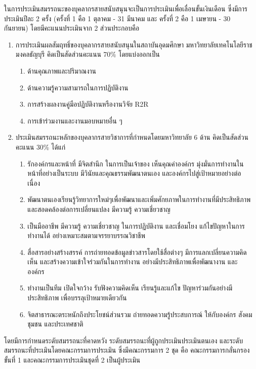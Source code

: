 ในการประเมินสมรรถนะของบุคลากรสายสนับสนุนจะเป็นการประเมินเพื่อเลื่อนขั้นเงินเดือน  ซึ่งมีการประเมินปีละ 2 ครั้ง (ครั้งที่ 1 คือ 1 ตุลาคม - 31 มีนาคม และ ครั้งที่ 2 คือ 1 เมษายน - 30 กันยายน)  โดยมีคะแนนประเมินจาก 2 ส่วนประกอบคือ 
\begin{enumerate}
\item การประเมินผลสัมฤทธิ์ของบุคลากรสายสนับสนุนในสถาบันอุดมศึกษา มหาวิทยาลัยเทคโนโลยีราชมงคลธัญบุรี คิดเป็นสัดส่วนคะแนน 70\% โดยแบ่งออกเป็น
\begin{enumerate}[label=(\arabic*),leftmargin=0.8cm, labelsep=2mm]
\item ด้านคุณภาพและปริมาณงาน
\item ด้านความรู้ความสามารถในการปฏิบัติงาน
\item การสร้างผลงานคู่มือปฏิบัติงานหรืองานวิจัย R2R
\item การเข้าร่วมงานและงานมอบหมายอื่น ๆ
\end{enumerate}
\item ประเมินสมรรถนะหลักของบุคลากรสายวิชาการที่กำหนดโดยมหาวิทยาลัย 6 ด้าน คิดเป็นสัดส่วนคะแนน 30\% ได้แก่
\begin{enumerate}[label=(\arabic*),leftmargin=0.8cm, labelsep=2mm]
\item รักองค์กรและหน้าที่ มีจิตสำนึก ในการเป็นเจ้าของ เห็นคุณค่าองค์กร มุ่งมั่นการทำงานในหน้าที่อย่างเป็นระบบ มีวินัยและคุณธรรมพัฒนาตนเอง และองค์กรไปสู่เป้าหมายอย่างต่อเนื่อง
\item พัฒนาตนเองเรียนรู้วิทยาการใหม่ๆเพื่อพัฒนาและเพิ่มศักยภาพในการทำงานที่มีประสิทธิภาพและสอดคล้องต่อการเปลี่ยนแปลง มีความรู้ ความเชี่ยวชาญ
\item เป็นมืออาชีพ มีความรู้ ความเชี่ยวชาญ ในการปฏิบัติงาน และเชื่อมโยง แก้ไขปัญหาในการทำงานได้ อย่างเหมาะสมตามจรรยาบรรณวิชาชีพ
\item สื่อสารอย่างสร้างสรรค์ การถ่ายทอดข้อมูลข่าวสารโดยใช้สื่อต่างๆ มีการแลกเปลี่ยนความคิดเห็น และสร้างความเข้าใจร่วมกันในการทำงาน อย่างมีประสิทธิภาพเพื่อพัฒนางาน และองค์กร
\item ทำงานเป็นทีม เปิดใจกว้าง รับฟังความคิดเห็น เรียนรู้และแก้ไข ปัญหาร่วมกันอย่างมีประสิทธิภาพ เพื่อบรรลุเป้าหมายเดียวกัน
\item จิตสาธารณะตระหนักถึงประโยชน์ส่วนรวม ถ่ายทอดความรู้ประสบการณ์ ให้กับองค์กร สังคมชุมชน และประเทศชาติ
\end{enumerate}
\end{enumerate}

โดยมีการกำหนดระดับสมรรถนะที่คาดหวัง ระดับสมรรถนะที่ผู้ถูกประเมินประเมินตนเอง และระดับสมรรถนะที่ประเมินโดยคณะกรรมการประเมิน ซึ่งมีคณะกรรมการ 2 ชุด คือ คณะกรรมการกลั่นกรองขั้นที่ 1 และคณะกรรมการประเมินชุดที่ 2 เป็นผู้ประเมิน
 
